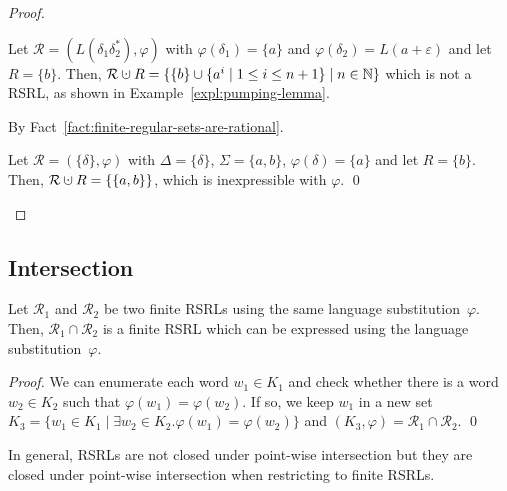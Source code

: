 \documentclass[envcountsame]{llncs}
\newcommand{\rationalset}{\ensuremath{\mathcal{R}}\xspace}
\newcommand{\bN}{\ensuremath{\mathbb{N}}\xspace}
\newcommand{\dotcup}{\:\ensuremath{\mathaccent\cdot\cup}\:}
\newcommand{\RegularlyGeneratedLanguageSetAbbrev}{RSRL\xspace}
\newcommand{\RegularlyGeneratedLanguageSetsAbbrev}{RSRLs\xspace}
\begin{document}
\begin{proof}
  \begin{inparaenum}[\bfseries(1)]
  \item Let $\rationalset = (L(\delta_1\delta_2^*), \varphi)$ with
    $\varphi(\delta_1) = \{ a \}$ and $\varphi(\delta_2) = L(a +
    \varepsilon)$ and let $R = \{ b \}$.  Then, $\rationalset \dotcup
    R = \{ \{ b \} \cup \{ a^i \mid 1 \leq i \leq n + 1 \} \mid n \in
    \bN \}$ which is not a \RegularlyGeneratedLanguageSetAbbrev, as shown in
    Example~\ref{expl:pumping-lemma}.
  \item By Fact~\ref{fact:finite-regular-sets-are-rational}.
  \item\label{proof:star-free-fixed-alphabet-point-wise-union} Let
    $\rationalset = (\{ \delta \}, \varphi)$ with $\Delta = \{
    \delta \}$, $\Sigma = \{ a, b \}$, $\varphi(\delta) = \{ a \}$
    and let $R = \{ b \}$.  Then, $\rationalset \dotcup R = \{ \{ a,
    b \} \}$, which is inexpressible with $\varphi$. \qed
  \end{inparaenum}
\end{proof}









\subsection{Intersection}
\label{sec:intersection}


\begin{proposition}
	\label{prop:closure:intersection}
Let $\rationalset_1$ and
      $\rationalset_2$ be two finite \RegularlyGeneratedLanguageSetsAbbrev using the same
      language substitution~$\varphi$.  Then, $\rationalset_1 \cap
      \rationalset_2$ is a finite \RegularlyGeneratedLanguageSetAbbrev which can be expressed
      using the language substitution~$\varphi$.
\end{proposition}

\begin{proof}
We can enumerate each word $w_1 \in K_1$ and check whether there is a word $w_2 \in K_2$ such that $\varphi(w_1) = \varphi(w_2)$.
	If so, we keep $w_1$ in a new set $K_3 = \{ w_1 \in K_1 \mid \exists w_2 \in K_2. \varphi(w_1) = \varphi(w_2)\}$ and $(K_3, \varphi) = \rationalset_1 \cap \rationalset_2$.
	\qed
\end{proof}


In general, \RegularlyGeneratedLanguageSetsAbbrev are not closed under point-wise intersection
but they are closed under point-wise intersection when restricting to
finite \RegularlyGeneratedLanguageSetsAbbrev.
\end{document}
